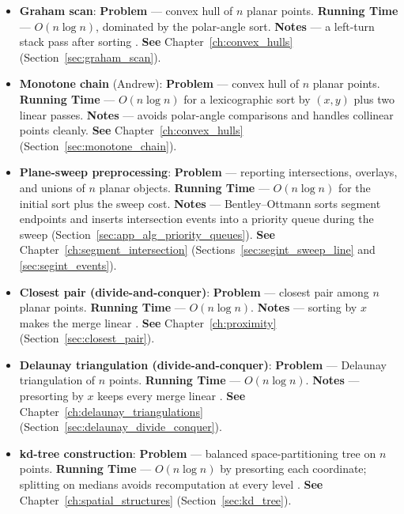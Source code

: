 \begin{itemize}
  \item \textbf{Graham scan}: \textbf{Problem} ---
    convex hull of $n$ planar points. \textbf{Running Time} --- $O(n\log n)$,
    dominated by the polar-angle sort. \textbf{Notes} --- a left-turn stack
    pass after sorting \cite{graham1972}. \textbf{See}
    Chapter~\ref{ch:convex_hulls} (Section~\ref{sec:graham_scan}).
  \item \textbf{Monotone chain} (Andrew):
    \textbf{Problem} --- convex hull of $n$ planar points.
    \textbf{Running Time} --- $O(n\log n)$ for a lexicographic sort by
    $(x,y)$ plus two linear passes. \textbf{Notes} --- avoids polar-angle
    comparisons and handles collinear points cleanly. \textbf{See}
    Chapter~\ref{ch:convex_hulls} (Section~\ref{sec:monotone_chain}).
  \item \textbf{Plane-sweep preprocessing}: \textbf{Problem} --- reporting
    intersections, overlays, and unions of $n$ planar objects.
    \textbf{Running Time} --- $O(n\log n)$ for the initial sort plus the
    sweep cost. \textbf{Notes} --- Bentley--Ottmann sorts segment endpoints
    and inserts intersection events into a priority queue during the sweep
    (Section~\ref{sec:app_alg_priority_queues}). \textbf{See}
    Chapter~\ref{ch:segment_intersection}
    (Sections~\ref{sec:segint_sweep_line} and \ref{sec:segint_events}).
  \item \textbf{Closest pair (divide-and-conquer)}:
    \textbf{Problem} --- closest pair among $n$ planar points.
    \textbf{Running Time} --- $O(n\log n)$. \textbf{Notes} --- sorting by
    $x$ makes the merge linear \cite{shamos1975}. \textbf{See}
    Chapter~\ref{ch:proximity} (Section~\ref{sec:closest_pair}).
  \item \textbf{Delaunay triangulation (divide-and-conquer)}:
    \textbf{Problem} --- Delaunay triangulation of $n$ points.
    \textbf{Running Time} --- $O(n\log n)$. \textbf{Notes} --- presorting
    by $x$ keeps every merge linear \cite{deberg2008}. \textbf{See}
    Chapter~\ref{ch:delaunay_triangulations}
    (Section~\ref{sec:delaunay_divide_conquer}).
  \item \textbf{kd-tree construction}: \textbf{Problem} --- balanced
    space-partitioning tree on $n$ points. \textbf{Running Time} ---
    $O(n\log n)$ by presorting each coordinate; splitting on medians
    avoids recomputation at every level \cite{bentley1975, samet2006}.
    \textbf{See} Chapter~\ref{ch:spatial_structures} (Section~\ref{sec:kd_tree}).

\end{itemize}
